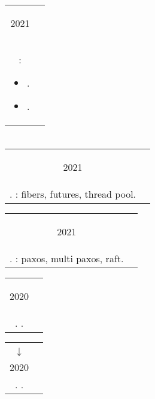 \documentclass{article}
\newif\ifen
\newif\ifru
\newcommand{\en}[1]{\ifen#1\fi}
\newcommand{\ru}[1]{\ifru#1\fi}
\newcommand{\entry}[3]{
	\begin{tabular}{ c | c }
    \begin{minipage}{0.05\linewidth}
    	\begin{center}
    		#1
    	\end{center}
    \end{minipage} 
    &
    \begin{minipage}{0.85\linewidth}
        \textbf{#2} \\ \footnotesize{#3}
    \end{minipage}
    \end{tabular}
}
\newcommand{\interval}[2]{
	#1 \\ $\downarrow$ \\ #2
}
\begin{document}
        \entry {\ru{Июль}\en{July} 2021}
        {\ru{Летняя школа Слон в Пущино}\en{Summer school <<Slon>> in Pushchino} - \ru{Волонтер-преподаватель}\en{Volunteer-tutor}}
        {\ru{Проведение курсов}\en{Courses taught}:
        	\begin{itemize}
        		\item \ru{Формальные языки}\en{Formal languages}.
        		\item \ru{Математическая логика}\en{Mathematical logic}.
        	\end{itemize}
    	}  

    \section{\ru{Курсы}}
    \entry {2021
        }
        {\ru{МФТИ}\en{MIPT} - \ru{Теория и практика многопоточной синхронизации}\en{Concurrency course} }
        {\ru{Язык C\texttt{++}}\en{C\texttt{++}}. \ru{Реализация библиотеки для работы с многопоточностью}\en{Implementation of simple concurrency library}: fibers, futures, thread pool.  }
    
    \vspace{.1cm}
    
    \entry {2021
        }
        {\ru{МФТИ}\en{MIPT} - \ru{Распределенные системы}\en{Distributed systems} }
        {\ru{Язык C\texttt{++}}\en{C\texttt{++}}. \ru{Реализация алгоритмов распределенных консенсуса и репликации}\en{Implementation of distributed consensus and replication algorithms}: paxos, multi paxos, raft.  }
    
    \vspace{.1cm}
    
    \entry {2020
        }
        {\ru{Тинькофф.Финтех}\en{Tinkoff.Fintech} - \ru{Курс разработки на Scala}\en{Scala development course} }
        { \ru{Язык Scala}\en{Scala}. \ru{Разработка RESTful сервиса StopLoss-TakeProfit для тинькофф инвестиций}\en{Impementation of StopLoss-TakeProfit service integrated with tinkoff.investments}. }
    
    \vspace{.1cm}
    
    \entry {\interval{2019}{2020}
    }
    {Mail.ru \ru{Технотрек} - \ru{Введение в промышленное программирование и структуры данных}\en{Introduction to production programming and data structures}}
    { \ru{Языки C, C\texttt{++}}\en{C, C\texttt{++}}. \ru{Разработка эмулятора стековой машины и компилятора высокоуровнего языка для нее}\en{Implementation of stack machine emulator and high-level language compiler for it}.} 
    
\end{document}
